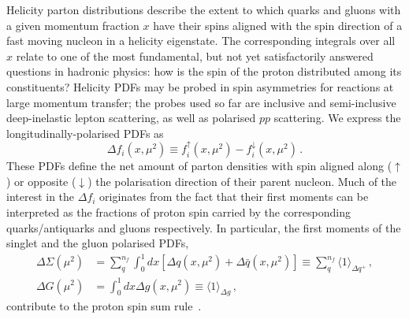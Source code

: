 Helicity parton distributions describe the extent to which quarks and gluons 
with a given momentum fraction $x$ have their spins aligned with the spin 
direction of a fast moving nucleon in a helicity eigenstate. 
%
The corresponding integrals over all $x$ relate to one of the most fundamental, 
but not yet satisfactorily answered questions in hadronic physics: 
how is the spin of the proton distributed among its constituents? 
%
Helicity PDFs may be probed in spin asymmetries for reactions at large momentum 
transfer; the probes used so far are inclusive and semi-inclusive 
deep-inelastic lepton scattering, as well as polarised $pp$ scattering. We express the
longitudinally-polarised PDFs as
\begin{equation}
\Delta f_i(x,\mu^2) \equiv f_i^{\uparrow}(x,\mu^2) - f_i^{\downarrow}(x,\mu^2)\,.
\label{eq:polPDFs}
\end{equation}
These PDFs define the net amount of parton 
densities with spin aligned along ($\uparrow$) or opposite ($\downarrow$)
the polarisation direction of their parent nucleon.
%
Much of the interest in the $\Delta f_i$ originates from the fact that their 
first moments can be interpreted as the fractions of proton spin 
carried by the corresponding quarks/antiquarks and gluons respectively. In particular,
the first moments of the singlet and the gluon polarised PDFs,
\begin{align}
\Delta\Sigma(\mu^2)
& =
\sum_{q}^{n_f}\int_0^1 dx 
\left[\Delta q(x, \mu^2) + \Delta\bar{q}(x, \mu^2)\right]
\equiv
\sum_q^{n_f}\langle 1 \rangle_{\Delta q^+}\,,
\\
\Delta G(\mu^2)
& =
\int_0^1 dx \Delta g(x,\mu^2)
\equiv
\langle 1 \rangle_{\Delta g}
\,,
\label{eq:moments}
\end{align}
contribute to the proton spin sum rule~\cite{Leader:2013jra}.
%

